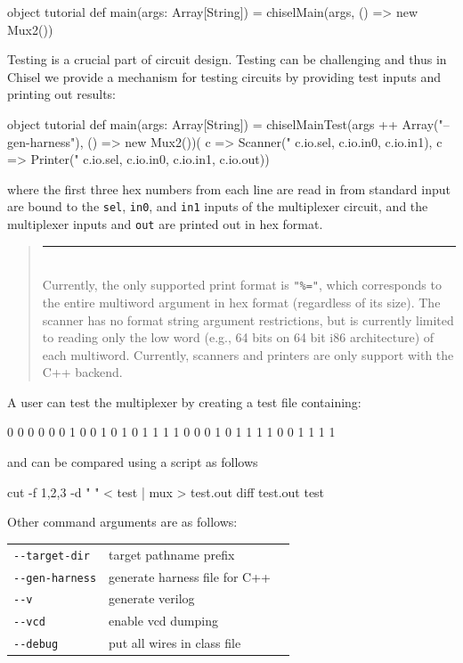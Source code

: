\documentclass[twocolumn,10pt]{article}
\newenvironment{commentary}
{ \vspace{-0.1in}
  \begin{quotation}
  \noindent
  \small \em
  \rule{\linewidth}{1pt}\\
}
{
  \end{quotation}
}
\begin{document}
\begin{scala}
object tutorial {
  def main(args: Array[String]) = {
    chiselMain(args, () => new Mux2())
  }
}
\end{scala}

Testing is a crucial part of circuit design.
Testing can be challenging and thus in Chisel we provide a mechanism for
testing circuits by providing test inputs and printing out results:
\begin{scala}
object tutorial {
  def main(args: Array[String]) = {
    chiselMainTest(args ++ Array("--gen-harness"), 
                   () => new Mux2())(
      c => Scanner("%
                   c.io.sel, c.io.in0, c.io.in1),
      c => Printer("%
                   c.io.sel, c.io.in0, c.io.in1, c.io.out))
  }
}
\end{scala}

\noindent
where the first three hex numbers from each line are read in from
standard input are bound to the \verb+sel+, \verb+in0+,  and
\verb+in1+ inputs of the multiplexer circuit, and the multiplexer
inputs and \verb+out+ are printed out in hex format.  
\begin{commentary}
Currently, the only supported print format is \verb!"%="!,
which corresponds to the entire multiword argument in hex format
(regardless of its size).
The scanner has no format string argument restrictions, 
but is currently limited to reading only the low word (e.g., 64 bits
on 64 bit i86 architecture) of each multiword.
Currently, scanners and printers are only support with the C++ backend.
\end{commentary}
A user can test the multiplexer by creating a test file containing:
\begin{scala}
0 0 0 0
0 0 1 0
0 1 0 1
0 1 1 1
1 0 0 0
1 0 1 1
1 1 0 0
1 1 1 1
\end{scala}

\noindent
and can be compared using a script as follows

\begin{scala}
cut -f 1,2,3 -d " " < test | mux > test.out
diff test.out test
\end{scala}

Other command arguments are as follows:
\begin{tabular}{lll}
\verb+--target-dir+ & target pathname prefix \\
\verb+--gen-harness+ & generate harness file for C++ \\
\verb+--v+ & generate verilog \\
\verb+--vcd+ & enable vcd dumping \\
\verb+--debug+ & put all wires in class file \\
\end{tabular}
\end{document}
